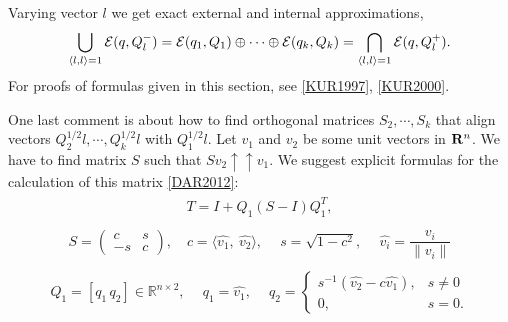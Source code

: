\documentclass[letterpaper,10pt,english]{sphinxmanual}
\begin{document}
Varying vector \(l\) we get exact external and internal
approximations,
\begin{gather}
\begin{split}\bigcup_{\langle l,l\rangle=1} {\mathcal E}(q,Q_l^-) =
{\mathcal E}(q_1,Q_1)\oplus\cdots\oplus{\mathcal E}(q_k,Q_k) =
\bigcap_{\langle l,l\rangle=1} {\mathcal E}(q,Q_l^+) .\end{split}\notag
\end{gather}
For proofs of formulas given in this section, see {\hyperref[chap_intro:kur1997]{{[}KUR1997{]}}}, {\hyperref[chap_intro:kur2000]{{[}KUR2000{]}}}.

One last comment is about how to find orthogonal matrices
\(S_2,\cdots,S_k\) that align vectors
\(Q_2^{1/2}l, \cdots, Q_k^{1/2}l\) with \(Q_1^{1/2}l\). Let
\(v_1\) and \(v_2\) be some unit vectors in \({\bf R}^n\).
We have to find matrix \(S\) such that
\(Sv_2\uparrow\uparrow v_1\).
We suggest explicit formulas for the
calculation of this matrix {\hyperref[chap_ellcalc:dar2012]{{[}DAR2012{]}}}:
\label{chap_ellcalc:equation-valign1}\begin{gather}
\begin{split}T = I + Q_1(S - I)Q_1^T,\end{split}\label{chap_ellcalc-valign1}
\end{gather}\label{chap_ellcalc:equation-valign2}\begin{gather}
\begin{split}S = \begin{pmatrix}
     c & s\\
     -s & c
    \end{pmatrix},\quad c = \langle\hat{v_1},\ \hat{v_2}\rangle,\ \quad s = \sqrt{1 - c^2},\ \quad \hat{v_i} = \dfrac{v_i}{\|v_i\|}\end{split}\label{chap_ellcalc-valign2}
\end{gather}\label{chap_ellcalc:equation-valign3}\begin{gather}
\begin{split}Q_1 = [q_1 \, q_2]\in \mathbb{R}^{n\times2},\ \quad q_1 = \hat{v_1},\ \quad q_2 = \begin{cases}
s^{-1}(\hat{v_2} - c\hat{v_1}),& s\ne 0\\
0,& s = 0.
\end{cases}\end{split}\label{chap_ellcalc-valign3}
\end{gather}
\end{document}
